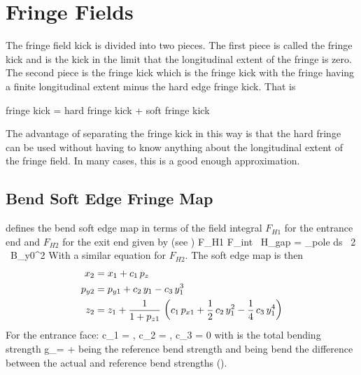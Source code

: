 \section{Fringe Fields}
\label{s:fringe.std}

The fringe field kick is divided into two pieces. 
The first piece is called the  fringe kick and is the kick in the limit
that the longitudinal extent of the fringe is zero. The second piece is the 
 fringe kick which is the fringe kick with the fringe having a finite
longitudinal extent minus the hard edge fringe kick. That is
\begin{example}
  fringe kick = hard fringe kick + soft fringe kick
\end{example}
The advantage of separating the fringe kick in this way is that the hard fringe can
be used without having to know anything about the longitudinal extent of the fringe
field. In many cases, this is a good enough approximation. 

\subsection{Bend Soft Edge Fringe Map}
\label{s:fringe.bend.soft}

\bmad defines the bend soft edge map in terms of the field integral
$F_{H1}$ for the entrance end and $F_{H2}$ for the exit end given by
(see )
\Begineq
  F_{H1} \equiv F_{int} \, H_{gap} = \int_{pole} \! \! ds \, 
  {2 \, B_{y0}^2}
\Endeq
With a similar equation for $F_{H2}$.
The soft edge map is then
\begin{align}
  x_2 &=  x_1 + c_1 \, p_z \nonumber \\
  p_{y2} &= p_{y1} + c_2 \, y_1 - c_3 \, y_1^3 \\
  z_2 &= z_1 + \frac{1}{1 + p_{z1}} \, \left( 
    c_1 \, p_{x1} + \frac{1}{2} \, c_2 \, y_1^2 -\frac{1}{4} \, c_3 \, y_1^4 \right)
    \nonumber
\end{align}
For the entrance face:
\Begineq
  c_1 = , \qquad 
  c_2 = , \qquad 
  c_3 = 0
\Endeq
with  is the total bending strength
\Begineq
  g_\tot =  + 
\Endeq
{} being the reference bend strength and  being
bend the difference between the actual and reference bend strengths
().

